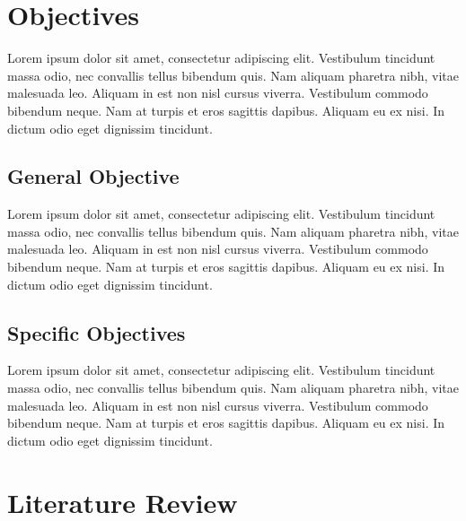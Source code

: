 \documentclass[a4paper,12pt]{article}
\begin{document}
\section{Objectives}

Lorem ipsum dolor sit amet, consectetur adipiscing elit. Vestibulum tincidunt massa odio, nec convallis tellus bibendum quis. Nam aliquam pharetra nibh, vitae malesuada leo. Aliquam in est non nisl cursus viverra. Vestibulum commodo bibendum neque. Nam at turpis et eros sagittis dapibus. Aliquam eu ex nisi. In dictum odio eget dignissim tincidunt.

\subsection{General Objective}

Lorem ipsum dolor sit amet, consectetur adipiscing elit. Vestibulum tincidunt massa odio, nec convallis tellus bibendum quis. Nam aliquam pharetra nibh, vitae malesuada leo. Aliquam in est non nisl cursus viverra. Vestibulum commodo bibendum neque. Nam at turpis et eros sagittis dapibus. Aliquam eu ex nisi. In dictum odio eget dignissim tincidunt.

\subsection{Specific Objectives}

Lorem ipsum dolor sit amet, consectetur adipiscing elit. Vestibulum tincidunt massa odio, nec convallis tellus bibendum quis. Nam aliquam pharetra nibh, vitae malesuada leo. Aliquam in est non nisl cursus viverra. Vestibulum commodo bibendum neque. Nam at turpis et eros sagittis dapibus. Aliquam eu ex nisi. In dictum odio eget dignissim tincidunt.


\section{Literature Review}
\end{document}
